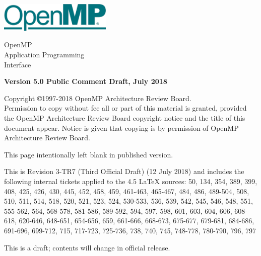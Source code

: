 
  \begin{titlepage}
    \begin{flushleft}
     \hspace{-6em} \includegraphics[width=0.4\textwidth]{openmp-logo.png}
    \end{flushleft}

    \begin{adjustwidth}{-0.75in}{0in}
    \begin{center}
      \Huge
      \textsf{OpenMP\\Application Programming\\Interface}

      \vspace{0.5in}\textsf{    }\vspace{-0.7in}
      \normalsize

      \vspace{1.0in}

      \textbf{Version 5.0 Public Comment Draft, July 2018}
    \end{center}
    \end{adjustwidth}

    \vspace{3.0in}

\begin{adjustwidth}{0pt}{1em}\setlength{\parskip}{0.25\baselineskip}%
Copyright \copyright 1997-2018 OpenMP Architecture Review Board.\\
Permission to copy without fee all or part of this material is granted,
provided the OpenMP Architecture Review Board copyright notice and
the title of this document appear. Notice is given that copying is by
permission of OpenMP Architecture Review Board.\end{adjustwidth}

  \end{titlepage}


\clearpage
\thispagestyle{empty}
\phantom{a}
This page intentionally left blank in published version.

This is Revision 3-TR7 (Third Official Draft) (12 July 2018) and
includes the following internal tickets applied to the 4.5 LaTeX sources:
50, 134, 354, 389, 399, 408, 425, 426, 430, 445, 452, 458, 459, 461-463, 
465-467, 484, 486, 489-504, 508, 510, 511, 514, 518, 520, 521, 523, 
524, 530-533, 536, 539, 542, 545, 546, 548, 551, 555-562, 564, 568-578, 
581-586, 589-592, 594, 597, 598, 601, 603, 604, 606, 608-618, 620-646, 
648-651, 654-656, 659, 661-666, 668-673, 675-677, 679-681, 684-686, 
691-696, 699-712, 715, 717-723, 725-736, 738, 740, 745, 748-778, 780-790, 
796, 797

This is a draft; contents will change in official release.

\vfill

